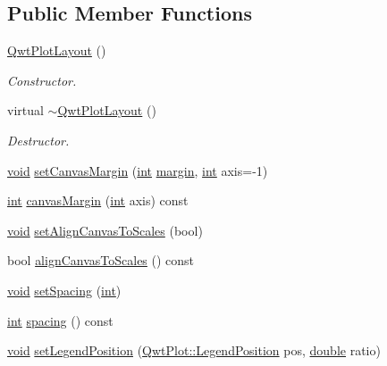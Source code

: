\subsection*{Public Member Functions}
\begin{DoxyCompactItemize}
\item 
\hyperlink{class_qwt_plot_layout_ac89596fb2a3d3a92901f124821045a47}{Qwt\-Plot\-Layout} ()
\begin{DoxyCompactList}\small\item\em Constructor. \end{DoxyCompactList}\item 
virtual \hyperlink{class_qwt_plot_layout_a39653485c638535bc11f50d2e5ef936d}{$\sim$\-Qwt\-Plot\-Layout} ()
\begin{DoxyCompactList}\small\item\em Destructor. \end{DoxyCompactList}\item 
\hyperlink{group___u_a_v_objects_plugin_ga444cf2ff3f0ecbe028adce838d373f5c}{void} \hyperlink{class_qwt_plot_layout_a11667dad6675a7a58cc60ab1597b1203}{set\-Canvas\-Margin} (\hyperlink{ioapi_8h_a787fa3cf048117ba7123753c1e74fcd6}{int} \hyperlink{fancylineedit_8cpp_a0fa6e789ab8d8c920f2104ee8c183196a9c8c6ada5d0208410d9bb9a14780df36}{margin}, \hyperlink{ioapi_8h_a787fa3cf048117ba7123753c1e74fcd6}{int} axis=-\/1)
\item 
\hyperlink{ioapi_8h_a787fa3cf048117ba7123753c1e74fcd6}{int} \hyperlink{class_qwt_plot_layout_aacf659495ecc45367eacf5f4b2aeca7d}{canvas\-Margin} (\hyperlink{ioapi_8h_a787fa3cf048117ba7123753c1e74fcd6}{int} axis) const 
\item 
\hyperlink{group___u_a_v_objects_plugin_ga444cf2ff3f0ecbe028adce838d373f5c}{void} \hyperlink{class_qwt_plot_layout_a147fcf4c59b34779b5a7dc7361a3b6c3}{set\-Align\-Canvas\-To\-Scales} (bool)
\item 
bool \hyperlink{class_qwt_plot_layout_ab0200ba639cfd0f31b798d6aa9b6bba7}{align\-Canvas\-To\-Scales} () const 
\item 
\hyperlink{group___u_a_v_objects_plugin_ga444cf2ff3f0ecbe028adce838d373f5c}{void} \hyperlink{class_qwt_plot_layout_a6508553ec1d66bede49e7767526c3d03}{set\-Spacing} (\hyperlink{ioapi_8h_a787fa3cf048117ba7123753c1e74fcd6}{int})
\item 
\hyperlink{ioapi_8h_a787fa3cf048117ba7123753c1e74fcd6}{int} \hyperlink{class_qwt_plot_layout_ae93650a8f3208578f87348334b77a282}{spacing} () const 
\item 
\hyperlink{group___u_a_v_objects_plugin_ga444cf2ff3f0ecbe028adce838d373f5c}{void} \hyperlink{class_qwt_plot_layout_a11c9695a68f95135841cb23212589f18}{set\-Legend\-Position} (\hyperlink{class_qwt_plot_a31aacb65b5c049dde8c34a0d8482661b}{Qwt\-Plot\-::\-Legend\-Position} pos, \hyperlink{_super_l_u_support_8h_a8956b2b9f49bf918deed98379d159ca7}{double} ratio)

\end{DoxyCompactItemize}
